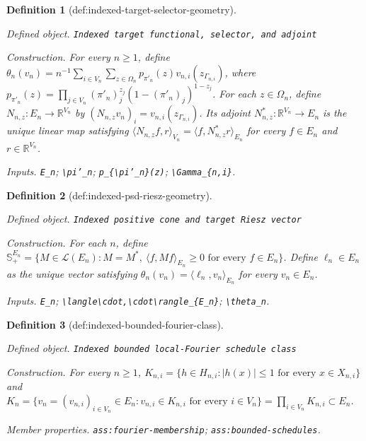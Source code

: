 \documentclass{article}
\newtheorem{definition}{Definition}
\begin{document}
\begin{definition}[def:indexed-target-selector-geometry]\label{def:indexed-target-selector-geometry}
\par\smallskip\noindent\emph{Defined object.} \texttt{Indexed target functional,\allowbreak{} selector,\allowbreak{} and adjoint}
\par\smallskip\noindent\emph{Construction.} For every \(n\ge1\), define \(\theta_n(v_n)=n^{-1}\sum_{i\in V_n}\sum_{z\in\Omega_n}p_{\pi'_n}(z)v_{n,i}(z_{\Gamma_{n,i}})\), where \(p_{\pi'_n}(z)=\prod_{j\in V_n}(\pi'_n)_j^{z_j}(1-(\pi'_n)_j)^{1-z_j}\). For each \(z\in\Omega_n\), define \(N_{n,z}:E_n\to\mathbb R^{V_n}\) by \((N_{n,z}v_n)_i=v_{n,i}(z_{\Gamma_{n,i}})\). Its adjoint \(N_{n,z}^{\ast}:\mathbb R^{V_n}\to E_n\) is the unique linear map satisfying \(\langle N_{n,z}f,r\rangle_{V_n}=\langle f,N_{n,z}^{\ast}r\rangle_{E_n}\) for every \(f\in E_n\) and \(r\in\mathbb R^{V_n}\).
\par\smallskip\noindent\emph{Inputs.} \texttt{E\_\allowbreak{}n}; \texttt{\textbackslash{}\allowbreak{}pi'\_\allowbreak{}n}; \texttt{p\_\allowbreak{}\{\textbackslash{}\allowbreak{}pi'\_\allowbreak{}n\}\allowbreak{}(z)}; \texttt{\textbackslash{}\allowbreak{}Gamma\_\allowbreak{}\{n,\allowbreak{}i\}\allowbreak{}}.
\end{definition}

\begin{definition}[def:indexed-psd-riesz-geometry]\label{def:indexed-psd-riesz-geometry}
\par\smallskip\noindent\emph{Defined object.} \texttt{Indexed positive cone and target Riesz vector}
\par\smallskip\noindent\emph{Construction.} For each \(n\), define \(\mathbb S_+^{E_n}=\{M\in\mathcal L(E_n):M=M^{\ast},\ \langle f,Mf\rangle_{E_n}\ge0\text{ for every }f\in E_n\}\). Define \(\ell_n\in E_n\) as the unique vector satisfying \(\theta_n(v_n)=\langle\ell_n,v_n\rangle_{E_n}\) for every \(v_n\in E_n\).
\par\smallskip\noindent\emph{Inputs.} \texttt{E\_\allowbreak{}n}; \texttt{\textbackslash{}\allowbreak{}langle\textbackslash{}\allowbreak{}cdot,\allowbreak{}\textbackslash{}\allowbreak{}cdot\textbackslash{}\allowbreak{}rangle\_\allowbreak{}\{E\_\allowbreak{}n\}\allowbreak{}}; \texttt{\textbackslash{}\allowbreak{}theta\_\allowbreak{}n}.
\end{definition}

\begin{definition}[def:indexed-bounded-fourier-class]\label{def:indexed-bounded-fourier-class}
\par\smallskip\noindent\emph{Defined object.} \texttt{Indexed bounded local-\allowbreak{}Fourier schedule class}
\par\smallskip\noindent\emph{Construction.} For every \(n\ge1\), \(K_{n,i}=\{h\in H_{n,i}:|h(x)|\le1\text{ for every }x\in X_{n,i}\}\) and \(K_n=\{v_n=(v_{n,i})_{i\in V_n}\in E_n:v_{n,i}\in K_{n,i}\text{ for every }i\in V_n\}=\prod_{i\in V_n}K_{n,i}\subset E_n\).
\par\smallskip\noindent\emph{Member properties.} \texttt{ass:\allowbreak{}fourier-\allowbreak{}membership}; \texttt{ass:\allowbreak{}bounded-\allowbreak{}schedules}.
\end{definition}
\end{document}
